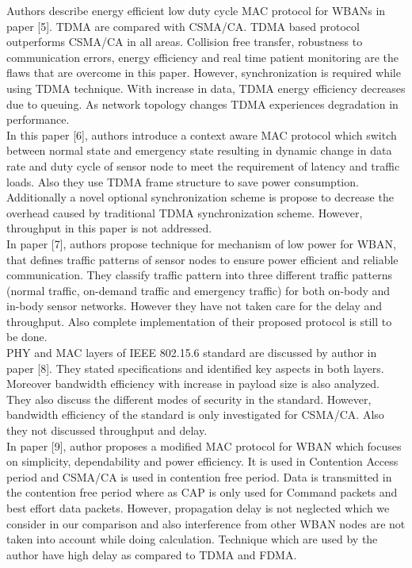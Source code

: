 \documentclass[10pt, conference, compsocconf]{IEEEtran}
\begin{document}
\indent Authors describe energy efficient low duty cycle MAC protocol for WBANs in paper [5]. TDMA are compared with CSMA/CA. TDMA based protocol outperforms CSMA/CA in all areas. Collision free transfer, robustness to communication errors, energy efficiency and real time patient monitoring are the flaws that are overcome in this paper. However, synchronization is required while using TDMA technique. With increase in data, TDMA energy efficiency decreases due to queuing. As network topology changes TDMA experiences degradation in performance.\\
\indent In this paper [6], authors introduce a context aware MAC protocol which switch between normal state and emergency state resulting in dynamic change in data rate and duty cycle of sensor node to meet the requirement of latency and traffic loads. Also they use TDMA frame structure to save power consumption. Additionally a novel optional synchronization scheme is propose to decrease the overhead caused by traditional TDMA synchronization scheme. However, throughput in this paper is not addressed.\\
\indent In paper [7], authors propose technique for mechanism of low power for WBAN, that defines traffic patterns of sensor nodes to ensure power efficient and reliable communication. They classify traffic pattern into three different traffic patterns (normal traffic, on-demand traffic and emergency traffic) for both on-body and in-body sensor networks. However they have not taken care for the delay and throughput. Also complete implementation of their proposed protocol is still to be done.\\
\indent PHY and MAC layers of IEEE 802.15.6 standard are discussed by author in paper [8]. They stated specifications and identified key aspects in both layers. Moreover bandwidth efficiency with increase in payload size is also analyzed. They also discuss the different modes of security in the standard. However, bandwidth efficiency of the standard is only investigated for CSMA/CA. Also they not discussed throughput and delay.\\
\indent In paper [9], author proposes a modified MAC protocol for WBAN which focuses on simplicity, dependability and power efficiency. It is used in Contention Access period and CSMA/CA is used in contention free period. Data is transmitted in the contention free period where as CAP is only used for Command packets and best effort data packets. However, propagation delay is not neglected which we consider in our comparison and also interference from other WBAN nodes are not taken into account while doing calculation. Technique which are used by the author have high delay as compared to TDMA and FDMA.\\
\end{document}
